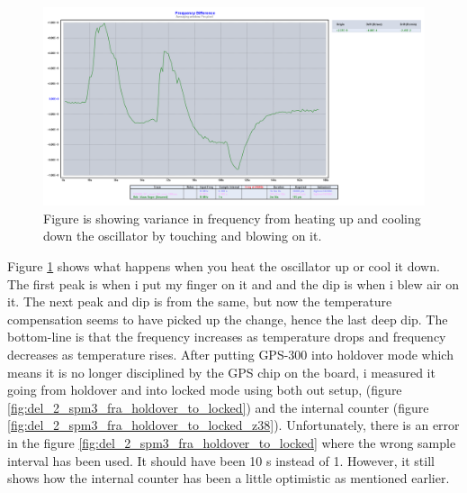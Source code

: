 \documentclass[11pt,english,a4paper]{article}
\begin{document}
\begin{figure}[!htb]
  \centering
    \includegraphics[width=1\textwidth]{del_2_spm2_fbtb_blaas_finger.png}
      \caption{Figure is showing variance in frequency from heating up and cooling down the oscillator by touching and blowing on it.}
          \label{fig:del_2_spm2_fbtb_blaas_finger}
\end{figure}

Figure \ref{fig:del_2_spm2_fbtb_blaas_finger} shows what happens when you heat the oscillator up or cool it down. The first peak is when i put my finger on it and and the dip is when i blew air on it. The next peak and dip is from the same, but now the temperature compensation seems to have picked up the change, hence the last deep dip. The bottom-line is that the frequency increases as temperature drops and frequency decreases as temperature rises. 
After putting GPS-300 into holdover mode which means it is no longer disciplined by the GPS chip on the board, i measured it going from holdover and into locked mode using both out setup, (figure \ref{fig:del_2_spm3_fra_holdover_to_locked}) and the internal counter (figure \ref{fig:del_2_spm3_fra_holdover_to_locked_z38}). Unfortunately, there is an error in the figure \ref{fig:del_2_spm3_fra_holdover_to_locked} where the wrong sample interval has been used. It should have been 10 s instead of 1. However, it still shows how the internal counter has been a little optimistic as mentioned earlier. 
\end{document}
